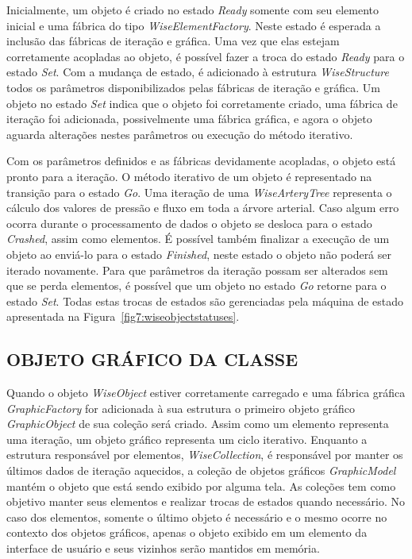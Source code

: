 Inicialmente, um objeto é criado no estado \textit{Ready} somente com seu elemento inicial e uma fábrica do tipo \textit{WiseElementFactory}. Neste estado é esperada a inclusão das fábricas de iteração e gráfica. Uma vez que elas estejam corretamente acopladas ao objeto, é possível fazer a troca do estado \textit{Ready} para o estado \textit{Set}. Com a mudança de estado, é adicionado à estrutura \textit{WiseStructure} todos os parâmetros disponibilizados pelas fábricas de iteração e gráfica. Um objeto no estado \textit{Set} indica que o objeto foi corretamente criado, uma fábrica de iteração foi adicionada, possivelmente uma fábrica gráfica, e agora o objeto aguarda alterações nestes parâmetros ou execução do método iterativo.

Com os parâmetros definidos e as fábricas devidamente acopladas, o objeto está pronto para a iteração. O método iterativo de um objeto é representado na transição para o estado \textit{Go}. Uma iteração de uma \textit{WiseArteryTree} representa o cálculo dos valores de pressão e fluxo em toda a árvore arterial. Caso algum erro ocorra durante o processamento de dados o objeto se desloca para o estado \textit{Crashed}, assim como elementos. É possível também finalizar a execução de um objeto ao enviá-lo para o estado \textit{Finished}, neste estado o objeto não poderá ser iterado novamente. Para que parâmetros da iteração possam ser alterados sem que se perda elementos, é possível que um objeto no estado \textit{Go} retorne para o estado \textit{Set}. Todas estas trocas de estados são gerenciadas pela máquina de estado apresentada na Figura~\ref{fig7:wiseobjectstatuses}.

\subsection{OBJETO GRÁFICO DA CLASSE}\label{sec:objeto_grafico}


Quando o objeto \textit{WiseObject} estiver corretamente carregado e uma fábrica gráfica \textit{GraphicFactory} for adicionada à sua estrutura o primeiro objeto gráfico \textit{GraphicObject} de sua coleção será criado. Assim como um elemento representa uma iteração, um objeto gráfico representa um ciclo iterativo. Enquanto a estrutura responsável por elementos, \textit{WiseCollection}, é responsável por manter os últimos dados de iteração aquecidos, a coleção de objetos gráficos \textit{GraphicModel} mantém o objeto que está sendo exibido por alguma tela. As coleções tem como objetivo manter seus elementos e realizar trocas de estados quando necessário. No caso dos elementos, somente o último objeto é necessário e o mesmo ocorre no contexto dos objetos gráficos, apenas o objeto exibido em um elemento da interface de usuário e seus vizinhos serão mantidos em memória.

